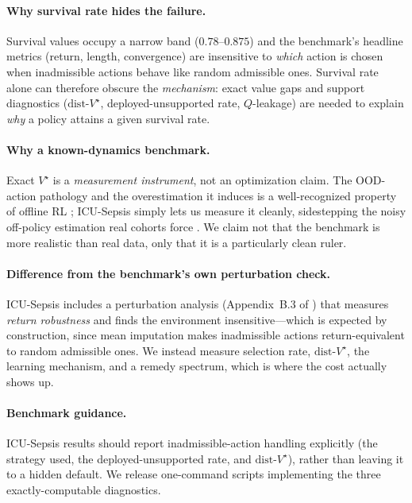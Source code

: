 \documentclass{article}
\newcommand{\dist}{\mathrm{dist}\text{-}V^\star}
\begin{document}
\paragraph{Why survival rate hides the failure.}
Survival values occupy a narrow band ($0.78$--$0.875$) and the benchmark's headline
metrics (return, length, convergence) are insensitive to \emph{which} action is
chosen when inadmissible actions behave like random admissible ones. Survival rate
alone can therefore obscure the \emph{mechanism}: exact value gaps and support
diagnostics ($\dist$, deployed-unsupported rate, $Q$-leakage) are needed to explain
\emph{why} a policy attains a given survival rate.

\paragraph{Why a known-dynamics benchmark.}
Exact $V^\star$ is a \emph{measurement instrument}, not an optimization claim. The
OOD-action pathology and the overestimation it induces is a well-recognized property
of offline RL \citep{kumar2020cql,kumar2019bear}; ICU-Sepsis simply lets us measure
it cleanly, sidestepping the noisy off-policy estimation real cohorts force
\citep{gottesman2019guidelines}. We claim not that the benchmark is more realistic
than real data, only that it is a particularly clean ruler.

\paragraph{Difference from the benchmark's own perturbation check.}
ICU-Sepsis includes a perturbation analysis (Appendix~B.3 of
\citealp{choudhary2024icusepsis}) that measures \emph{return robustness} and finds
the environment insensitive---which is expected by construction, since mean
imputation makes inadmissible actions return-equivalent to random admissible ones.
We instead measure selection rate, $\dist$, the learning mechanism, and a remedy
spectrum, which is where the cost actually shows up.

\paragraph{Benchmark guidance.}
ICU-Sepsis results should report inadmissible-action handling explicitly
(the strategy used, the deployed-unsupported rate, and $\dist$), rather than leaving
it to a hidden default. We release one-command scripts implementing the three
exactly-computable diagnostics.
\end{document}
